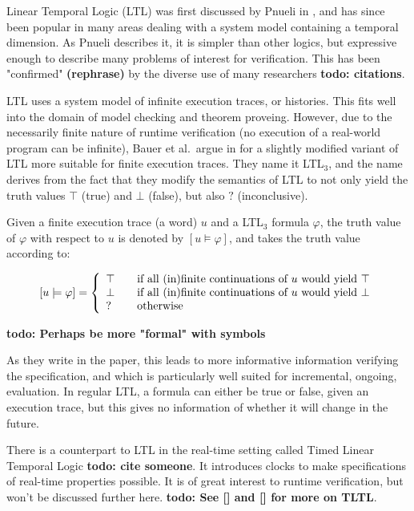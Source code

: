 \documentclass[a4paper,11pt]{kth-mag}
\newcommand{\todo}[1]{\textbf{todo: #1}}
\newcommand{\rephrase}{\textbf{(rephrase)} }
\begin{document}
Linear Temporal Logic (LTL) was first discussed by Pnueli in \cite{pnueli77},
and has since been popular in many areas dealing with a system model containing
a temporal dimension. As Pnueli describes it, it is simpler than other logics,
but expressive enough to describe many problems of interest for verification.
This has been "confirmed" \rephrase by the diverse use of many researchers
\todo{citations}.

LTL uses a system model of infinite execution traces, or histories. This fits
well into the domain of model checking and theorem proveing. However, due to
the necessarily finite nature of runtime verification (no execution of a
real-world program can be infinite), Bauer et al.\ argue in
\cite{bauer07rvltl,bauer06monitoring} for a slightly modified variant of LTL
more suitable for finite execution traces. They name it LTL$_3$, and the name
derives from the fact that they modify the semantics of LTL to not only yield
the truth values $\top$ (true) and $\bot$ (false), but also $?$ (inconclusive).

Given a finite execution trace (a word) $u$ and a LTL$_3$ formula $\varphi$,
the truth value of $\varphi$ with respect to $u$ is denoted by $[u \models
\varphi]$, and takes the truth value according to:

\[
  [u \models \varphi] = \left\{
  \begin{array}{l l}
    \top & \quad \text{if all (in)finite continuations of $u$ would yield $\top$} \\
    \bot & \quad \text{if all (in)finite continuations of $u$ would yield $\bot$} \\
    ?    & \quad \text{otherwise} \\
  \end{array} \right.
\]

\todo{Perhaps be more "formal" with symbols}

As they write in the paper, this leads to more informative information
verifying the specification, and which is particularly well suited for
incremental, ongoing, evaluation. In regular LTL, a formula can either be true
or false, given an execution trace, but this gives no information of whether it
will change in the future.

There is a counterpart to LTL in the real-time setting called Timed Linear
Temporal Logic \todo{cite someone}. It introduces clocks to make specifications
of real-time properties possible. It is of great interest to runtime
verification, but won't be discussed further here. \todo{See [] and [] for more
on TLTL}.
\end{document}
